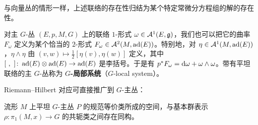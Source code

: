 与向量丛的情形一样，上述联络的存在性归结为某个特定常微分方程组的解的存在性。

对主 $G$-丛 $(E,p,M,G)$ 上的联络 $1$-形式 $\omega\in\mathcal{A}^1(E,\mathfrak{g})$，我们也可以把它的曲率 $F_\omega$ 定义为某个恰当的 $2$-形式 $F_\omega\in\mathcal{A}^2(M,\operatorname{ad}(E))$。特别地，对 $\eta\in\mathcal{A}^1(M,\operatorname{ad}(E))$，$\eta\wedge\eta$ 由 $(v,w)\mapsto\frac{1}{2}[\eta(v),\eta(w)]$ 定义，其中 $[\ ,\ ]\colon\op{ad}(E)\otimes\op{ad}(E)\to\op{ad}(E)$ 是李括号。于是有 $p^\ast F_\omega=\mathrm{d}\omega+\omega\wedge\omega$。带有平坦联络的主 $G$-丛称为 \textbf{$G$-局部系统}（$G$-local system）。

Riemann–Hilbert 对应可直接推广到 $G$-主丛：

\begin{theorem}[3.37]
流形 $M$ 上平坦 $G$-主丛 $P$ 的规范等价类所成的空间，与基本群表示 $\rho\colon\pi_1(M,x)\to G$ 的共轭类之间存在同构。
\end{theorem}
